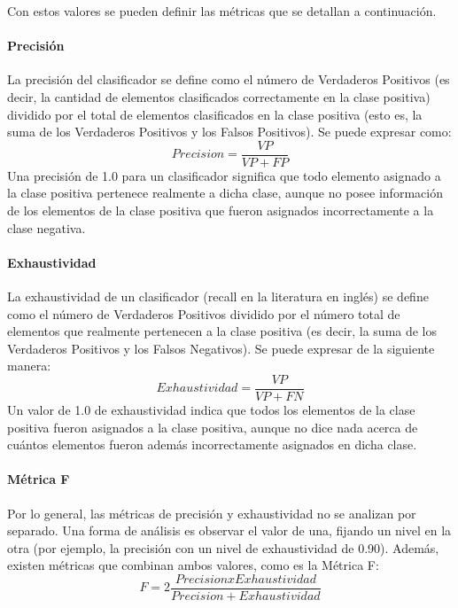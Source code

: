 \documentclass[a4paper,11pt,spanish]{book}
\begin{document}
	  Con estos valores se pueden definir las métricas que se detallan a continuación.

	  \paragraph { Precisión }
	    La precisión del clasificador se define como el número de Verdaderos Positivos (es decir, la cantidad de elementos clasificados correctamente en la clase positiva)
	    dividido por el total de elementos clasificados en la clase positiva (esto es, la suma de los Verdaderos Positivos y los Falsos Positivos). Se puede expresar como:
	    \begin{equation}
	     Precision = {\frac {VP}{VP+FP}}
	    \end{equation}
	    Una precisión de 1.0 para un clasificador significa que todo elemento asignado a la clase positiva pertenece realmente a dicha clase, aunque no posee información
	    de los elementos de la clase positiva que fueron asignados incorrectamente a la clase negativa.

	  \paragraph { Exhaustividad }
	    La exhaustividad de un clasificador (recall en la literatura en inglés) se define como el número de Verdaderos Positivos dividido por el número total de elementos que
	    realmente pertenecen a la clase positiva (es decir, la suma de los Verdaderos Positivos y los Falsos Negativos). Se puede expresar de la siguiente manera:
	    \begin{equation}
	     Exhaustividad = {\frac {VP}{VP+FN}}
	    \end{equation}
	    Un valor de 1.0 de exhaustividad indica que todos los elementos de la clase positiva fueron asignados a la clase positiva, aunque no dice nada acerca de cuántos elementos
	    fueron además incorrectamente asignados en dicha clase.

	  \paragraph { Métrica F }
	    Por lo general, las métricas de precisión y exhaustividad no se analizan por separado. Una forma de análisis es observar el valor de una, fijando un nivel en la otra
	    (por ejemplo, la precisión con un nivel de exhaustividad de 0.90). Además, existen métricas que combinan ambos valores, como es la Métrica F:
	    \begin{equation}
	      F = 2 {\frac {Precision x Exhaustividad}{Precision + Exhaustividad}}
	    \end{equation}
\end{document}
